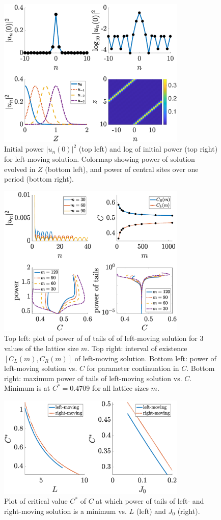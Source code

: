 \documentclass[reprint, amsmath,amssymb,aps,pre]{revtex4-2}
\begin{document}
\begin{figure}
    \centering
    \includegraphics[width=9cm]{leftsol.eps}
    \caption{Initial power $|u_n(0)|^2$ (top left) and log of initial power (top right) for left-moving solution. Colormap showing power of solution evolved in $Z$ (bottom left), and power of central sites over one period (bottom right).}
    \label{fig:leftsol}
\end{figure}

\begin{figure}
    \centering
    \includegraphics[width=9cm]{leftdiag.eps}
    \caption{Top left: plot of power of of tails of of left-moving solution for 3 values of the lattice size $m$. Top right: interval of existence $[C_L(m),C_R(m)]$ of left-moving solution. Bottom left: power of left-moving solution vs. $C$ for parameter continuation in $C$. Bottom right: maximum power of tails of left-moving solution vs. $C$. Minimum is at $C^* = 0.4709$ for all lattice sizes $m$.}
    \label{fig:leftdiag}
\end{figure}

\begin{figure}
    \centering
    \includegraphics[width=9cm]{Cstar.eps}
    \caption{Plot of critical value $C^*$ of $C$ at which power of tails of left- and right-moving solution is a minimum vs. $L$ (left) and $J_0$ (right).}
    \label{fig:Cstar}
\end{figure}
\end{document}
